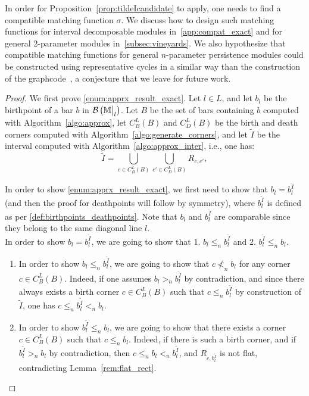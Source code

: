 \documentclass{article}
\newcommand{\barcode}[1]{ {\mathcal B}\left(#1\right) }
\newcommand{\matching}{\sigma}
\newcommand{\Mbb}{\mathbb{M}}
\newcommand{\leqn}{\leq_n}
\newcommand{\sln}{<_n}
\newcommand{\sgn}{>_n}
\newcommand{\birthLcp}[1]{ C_B^L(#1) }
\newcommand{\deathLcp}[1]{ C_D^L(#1) }
\newcommand{\rectangle}[2]{ R_{#1, #2} }
\newcommand\restr[2]{{  \left.\kern-\nulldelimiterspace #1 \vphantom{\big|} \right|_{#2}  }}
\newcommand{\birthptapprox}{b_l}
\begin{document}
In order for Proposition~\ref{prop:tildeIcandidate} to apply, one needs to find a compatible matching function $\matching$.
We discuss how to design such matching functions for interval decomposable modules in~\cref{app:compat_exact}
and for general $2$-parameter modules in~\cref{subsec:vineyards}.
We also hypothesize that compatible matching functions for general $n$-parameter persistence modules
could be constructed using representative cycles in a similar way than the
construction of the graphcode~\cite{russoldGraphcodeLearningMultiparameter2024, kerberRepresentingTwoparameterPersistence2025}, a conjecture that we leave for future work.


\begin{proof} %

	We first prove \ref{enum:apprx_result_exact}. Let $l\in L$, and let $\birthptapprox$ be the birthpoint of a bar $b$ in $\barcode{\restr{\Mbb}{l}}$.
	Let $B$ be the set of bars containing $b$ computed with
	Algorithm~\ref{algo:approx}, let $\birthLcp{B}$ and $\deathLcp{B}$ be the
	birth and death corners computed with Algorithm~\ref{algo:generate_corners}, and let $\tilde I$ be the interval computed with Algorithm~\ref{algo:approx_inter},
	i.e., one has:
	\begin{equation}\label{heuristic}
		 \tilde I =  \bigcup_{c \in \birthLcp{B}} \bigcup_{c' \in \deathLcp{B}} \rectangle{c}{c'} ,
	\end{equation}

	In order to show \ref{enum:apprx_result_exact},
	we first need to show that $\birthptapprox=b^{\tilde I}_l$ (and then the proof for deathpoints will follow by symmetry), where $b^{\tilde I}_l$ is defined as per \cref{def:birthpoints_deathpoints}.
	Note that $\birthptapprox$ and $b^{\tilde I}_l$ are comparable since they belong to the same diagonal line $l$. \\

	 In order to show $\birthptapprox=b^{\tilde I}_l$, we
	are going to show that 1. $\birthptapprox\leqn b^{\tilde I}_l$ and 2. $b^{\tilde I}_l\leqn \birthptapprox$. %

	\begin{enumerate}
		\item In order to show $\birthptapprox\leqn b^{\tilde I}_l$,
			we are going to show that
			$c \not \sln \birthptapprox$ for any corner $c\in \birthLcp{B}$.
			Indeed, if one assumes $\birthptapprox \sgn b^{\tilde I}_l$ by contradiction, and since
			there always exists a birth corner $c\in \birthLcp{B}$ such that $c\leqn b^{\tilde I}_l$ by construction of $\tilde I$,
			one has $c\leqn b^{\tilde I}_l \sln \birthptapprox$.
		\item In order to show $b^{\tilde I}_l\leqn \birthptapprox$,
			we are going to show that
			there exists a corner $c \in \birthLcp{B}$ such that $c \leqn \birthptapprox$.
			Indeed, if there is such a birth corner, and if $b^{\tilde I}_l \sgn \birthptapprox$ by contradiction, then
			$c\leqn \birthptapprox \sln b^{\tilde I}_l$, and $\rectangle{c}{b^{\tilde I}_l}$ is not flat, contradicting Lemma~\ref{rem:flat_rect}.
	\end{enumerate}


\end{proof}
\end{document}

